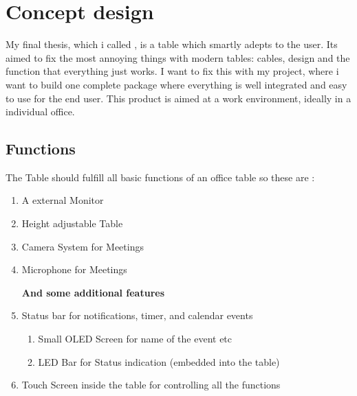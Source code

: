 \section{Concept design}
My final thesis, which i called \pjname, is a table which smartly adepts to the user.
Its aimed to fix the most annoying things with modern tables: cables, design and the function that everything just works. I want to fix this with my project, where i want to build one complete package where everything is well integrated and easy to use for the end user. This product is aimed at a work environment, ideally in a individual office. 

\subsection{Functions}
The Table should fulfill all basic functions of an office table so these are : 

\begin{enumerate}
\item A external Monitor 
\item Height adjustable Table
\item Camera System for Meetings
\item Microphone for Meetings
\vspace{0.3cm}

\textbf{And some additional features}

\item Status bar for notifications, timer, and calendar events
\begin{enumerate}
	\item Small OLED Screen for name of the event etc 
	\item LED Bar for Status indication (embedded into the table)
\end{enumerate}
\item Touch Screen inside the table for controlling all the functions
\end{enumerate}

